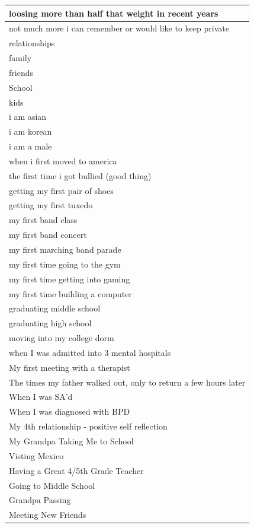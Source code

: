 \documentclass[
  .7em,
  letterpaper,
  DIV=11,
  numbers=noendperiod]{scrartcl}
\begin{document}
\begin{table}
\begin{tabular}{l}
loosing more than half that weight in recent years\\
\hline
not much more i can remember or would like to keep private\\
\hline
relationships\\
\hline
family\\
\hline
friends\\
\hline
School\\
\hline
kids\\
\hline
i am asian\\
\hline
i am korean\\
\hline
i am a male\\
\hline
when i first moved to america\\
\hline
the first time i got bullied (good thing)\\
\hline
getting my first pair of shoes\\
\hline
getting my first tuxedo\\
\hline
my first band class\\
\hline
my first band concert\\
\hline
my first marching band parade\\
\hline
my first time going to the gym\\
\hline
my first time getting into gaming\\
\hline
my first time building a computer\\
\hline
graduating middle school\\
\hline
graduating high school\\
\hline
moving into my college dorm\\
\hline
when I was admitted into 3 mental hospitals\\
\hline
My first meeting with a therapist\\
\hline
The times my father walked out, only to return a few hours later\\
\hline
When I was SA'd\\
\hline
When I was diagnosed with BPD\\
\hline
My 4th relationship - positive self reflection\\
\hline
My Grandpa Taking Me to School\\
\hline
Visting Mexico\\
\hline
Having a Great 4/5th Grade Teacher\\
\hline
Going to Middle School\\
\hline
Grandpa Passing\\
\hline
Meeting New Friends\\

\end{tabular}
\end{table}
\end{document}
